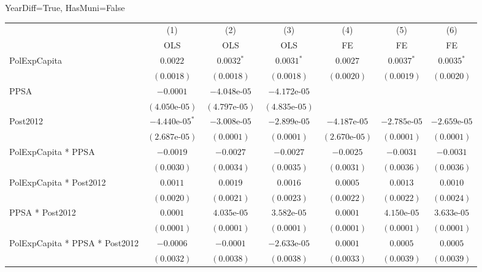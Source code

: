 \documentclass[border=10pt,varwidth=25cm]{standalone}
\renewenvironment{table}[1][]{}{}
\begin{document}
\begin{table}[H]
    \centering
    \scriptsize
    \begin{minipage}{\textwidth}
    \centering
    {\normalsize YearDiff=True, HasMuni=False}
    \vspace{6pt}
    \begin{tabular}{lcccccc}
        \toprule
         & (1) & (2) & (3) & (4) & (5) & (6) \\
         & OLS & OLS & OLS & FE & FE & FE \\
        \midrule
        PolExpCapita & $0.0022$ & $0.0032^{*}$ & $0.0031^{*}$ & $0.0027$ & $0.0037^{*}$ & $0.0035^{*}$ \\
         & $(0.0018)$ & $(0.0018)$ & $(0.0018)$ & $(0.0020)$ & $(0.0019)$ & $(0.0020)$ \\[4pt]
        PPSA & $-0.0001$ & $-4.048\text{e-}05$ & $-4.172\text{e-}05$ &  &  &  \\
         & $(4.050\text{e-}05)$ & $(4.797\text{e-}05)$ & $(4.835\text{e-}05)$ &  &  &  \\[4pt]
        Post2012 & $-4.440\text{e-}05^{*}$ & $-3.008\text{e-}05$ & $-2.899\text{e-}05$ & $-4.187\text{e-}05$ & $-2.785\text{e-}05$ & $-2.659\text{e-}05$ \\
         & $(2.687\text{e-}05)$ & $(0.0001)$ & $(0.0001)$ & $(2.670\text{e-}05)$ & $(0.0001)$ & $(0.0001)$ \\[4pt]
        PolExpCapita * PPSA & $-0.0019$ & $-0.0027$ & $-0.0027$ & $-0.0025$ & $-0.0031$ & $-0.0031$ \\
         & $(0.0030)$ & $(0.0034)$ & $(0.0035)$ & $(0.0031)$ & $(0.0036)$ & $(0.0036)$ \\[4pt]
        PolExpCapita * Post2012 & $0.0011$ & $0.0019$ & $0.0016$ & $0.0005$ & $0.0013$ & $0.0010$ \\
         & $(0.0020)$ & $(0.0021)$ & $(0.0023)$ & $(0.0022)$ & $(0.0022)$ & $(0.0024)$ \\[4pt]
        PPSA * Post2012 & $0.0001$ & $4.035\text{e-}05$ & $3.582\text{e-}05$ & $0.0001$ & $4.150\text{e-}05$ & $3.633\text{e-}05$ \\
         & $(0.0001)$ & $(0.0001)$ & $(0.0001)$ & $(0.0001)$ & $(0.0001)$ & $(0.0001)$ \\[4pt]
        PolExpCapita * PPSA * Post2012 & $-0.0006$ & $-0.0001$ & $-2.633\text{e-}05$ & $0.0001$ & $0.0005$ & $0.0005$ \\
         & $(0.0032)$ & $(0.0038)$ & $(0.0038)$ & $(0.0033)$ & $(0.0039)$ & $(0.0039)$ \\[4pt]

\end{tabular}
\end{minipage}
\end{table}
\end{document}

